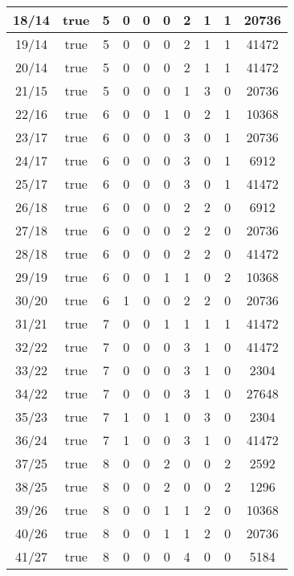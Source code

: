\begin{frame}
{{\begin{tabular}{|c|c|c|c|c|c|c|c|c|c|}
				\hline
				18/14 & true & 5 & 0 &  0 &  0 &  2 &  1 &  1 & 20736\\
				\hline
				19/14 & true & 5 & 0 &  0 &  0 &  2 &  1 &  1 & 41472\\
				\hline
				20/14 & true & 5 & 0 &  0 &  0 &  2 &  1 &  1 & 41472\\
				\hline
				21/15 & true & 5 & 0 &  0 &  0 &  1 &  3 &  0 & 20736\\
				\hline
				22/16 & true & 6 & 0 &  0 &  1 &  0 &  2 &  1 & 10368\\
				\hline
				23/17 & true & 6 & 0 &  0 &  0 &  3 &  0 &  1 & 20736\\
				\hline
				24/17 & true & 6 & 0 &  0 &  0 &  3 &  0 &  1 & 6912\\
				\hline
				25/17 & true & 6 & 0 &  0 &  0 &  3 &  0 &  1 & 41472\\
				\hline
				26/18 & true & 6 & 0 &  0 &  0 &  2 &  2 &  0 & 6912\\
				\hline
				27/18 & true & 6 & 0 &  0 &  0 &  2 &  2 &  0 & 20736\\
				\hline
				28/18 & true & 6 & 0 &  0 &  0 &  2 &  2 &  0 & 41472\\
				\hline
				29/19 & true & 6 & 0 &  0 &  1 &  1 &  0 &  2 & 10368\\
				\hline
				30/20 & true & 6 & 1 &  0 &  0 &  2 &  2 &  0 & 20736\\
				\hline
				31/21 & true & 7 & 0 &  0 &  1 &  1 &  1 &  1 & 41472\\
				\hline
				32/22 & true & 7 & 0 &  0 &  0 &  3 &  1 &  0 & 41472\\
				\hline
				33/22 & true & 7 & 0 &  0 &  0 &  3 &  1 &  0 & 2304\\
				\hline
				34/22 & true & 7 & 0 &  0 &  0 &  3 &  1 &  0 & 27648\\
				\hline
				35/23 & true & 7 & 1 &  0 &  1 &  0 &  3 &  0 & 2304\\
				\hline
				36/24 & true & 7 & 1 &  0 &  0 &  3 &  1 &  0 & 41472\\
				\hline
				37/25 & true & 8 & 0 &  0 &  2 &  0 &  0 &  2 & 2592\\
				\hline
				38/25 & true & 8 & 0 &  0 &  2 &  0 &  0 &  2 & 1296\\
				\hline
				39/26 & true & 8 & 0 &  0 &  1 &  1 &  2 &  0 & 10368\\
				\hline
				40/26 & true & 8 & 0 &  0 &  1 &  1 &  2 &  0 & 20736\\
				\hline
				41/27 & true & 8 & 0 &  0 &  0 &  4 &  0 &  0 & 5184\\

\end{tabular}}}
\end{frame}
